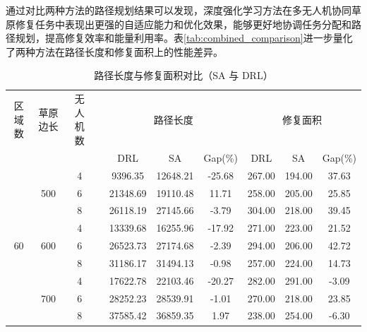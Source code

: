 \documentclass[AutoFakeBold]{LZUThesis}
\begin{document}
通过对比两种方法的路径规划结果可以发现，深度强化学习方法在多无人机协同草原修复任务中表现出更强的自适应能力和优化效果，能够更好地协调任务分配和路径规划，提高修复效率和能量利用率。表\ref{tab:combined_comparison}进一步量化了两种方法在路径长度和修复面积上的性能差异。
\begin{table}[H]
	\centering
	\caption{路径长度与修复面积对比（SA 与 DRL）}
	\small
	\setlength{\tabcolsep}{3.5pt}
	\begin{tabular}{cccc ccc ccc}
		\toprule
		区域数                 & 草原边长                 & 无人机数 &  & \multicolumn{3}{c}{路径长度} & \multicolumn{3}{c}{修复面积}                                       \\
		\cmidrule(lr){5-7} \cmidrule(lr){8-10}
		                    &                      &      &  & DRL                      & SA                       & Gap(\%) & DRL    & SA     & Gap(\%) \\
		\midrule
		\multirow{9}{*}{60} & \multirow{3}{*}{500} & 4    &  & 9396.35                  & 12648.21                 & -25.68  & 267.00 & 194.00 & 37.63   \\
		                    &                      & 6    &  & 21348.69                 & 19110.48                 & 11.71   & 258.00 & 205.00 & 25.85   \\
		                    &                      & 8    &  & 26118.19                 & 27145.66                 & -3.79   & 304.00 & 218.00 & 39.45   \\
		\cmidrule(lr){2-10}
		                    & \multirow{3}{*}{600} & 4    &  & 13339.68                 & 16255.96                 & -17.92  & 271.00 & 223.00 & 21.52   \\
		                    &                      & 6    &  & 26523.73                 & 27174.68                 & -2.39   & 294.00 & 206.00 & 42.72   \\
		                    &                      & 8    &  & 31186.17                 & 31494.13                 & -0.98   & 257.00 & 224.00 & 14.73   \\
		\cmidrule(lr){2-10}
		                    & \multirow{3}{*}{700} & 4    &  & 17622.78                 & 22103.46                 & -20.27  & 282.00 & 291.00 & -3.09   \\
		                    &                      & 6    &  & 28252.23                 & 28539.91                 & -1.01   & 270.00 & 218.00 & 23.85   \\
		                    &                      & 8    &  & 37585.42                 & 36859.35                 & 1.97    & 238.00 & 254.00 & -6.30   \\

\end{tabular}
\end{table}
\end{document}

